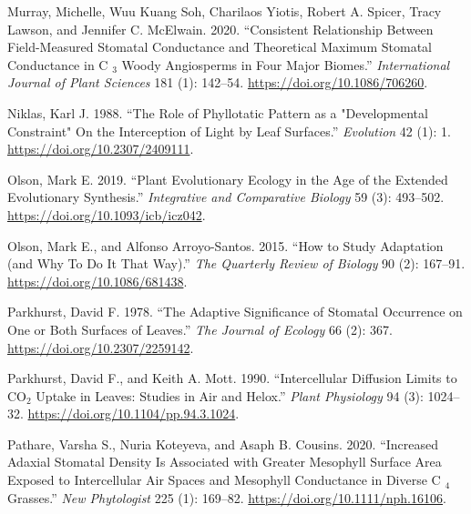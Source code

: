 \documentclass[
  12pt,
]{article}
\newlength{\cslhangindent}
\newlength{\cslentryspacingunit} %
\newenvironment{CSLReferences}[2] %
 {%
  \setlength{\parindent}{0pt}
  \ifodd #1
  \let\oldpar\par
  \def\par{\hangindent=\cslhangindent\oldpar}
  \fi
  \setlength{\parskip}{#2\cslentryspacingunit}
 }%
 {}
\begin{document}
\begin{CSLReferences}{1}{0}
\leavevmode{}%
Murray, Michelle, Wuu Kuang Soh, Charilaos Yiotis, Robert A. Spicer, Tracy Lawson, and Jennifer C. McElwain. 2020. {``Consistent {Relationship} Between {Field}-{Measured} {Stomatal} {Conductance} and {Theoretical} {Maximum} {Stomatal} {Conductance} in {C} \(_{\textrm{3}}\) {Woody} {Angiosperms} in {Four} {Major} {Biomes}.''} \emph{International Journal of Plant Sciences} 181 (1): 142--54. \url{https://doi.org/10.1086/706260}.

\leavevmode{}%
Niklas, Karl J. 1988. {``The {Role} of {Phyllotatic} {Pattern} as a "{Developmental} {Constraint}" {On} the {Interception} of {Light} by {Leaf} {Surfaces}.''} \emph{Evolution} 42 (1): 1. \url{https://doi.org/10.2307/2409111}.

\leavevmode{}%
Olson, Mark E. 2019. {``Plant {Evolutionary} {Ecology} in the {Age} of the {Extended} {Evolutionary} {Synthesis}.''} \emph{Integrative and Comparative Biology} 59 (3): 493--502. \url{https://doi.org/10.1093/icb/icz042}.

\leavevmode{}%
Olson, Mark E., and Alfonso Arroyo-Santos. 2015. {``How to {Study} {Adaptation} (and {Why} {To} {Do} {It} {That} {Way}).''} \emph{The Quarterly Review of Biology} 90 (2): 167--91. \url{https://doi.org/10.1086/681438}.

\leavevmode{}%
Parkhurst, David F. 1978. {``The {Adaptive} {Significance} of {Stomatal} {Occurrence} on {One} or {Both} {Surfaces} of {Leaves}.''} \emph{The Journal of Ecology} 66 (2): 367. \url{https://doi.org/10.2307/2259142}.

\leavevmode{}%
Parkhurst, David F., and Keith A. Mott. 1990. {``Intercellular Diffusion Limits to {CO}\(_{\textrm{2}}\) Uptake in Leaves: Studies in Air and Helox.''} \emph{Plant Physiology} 94 (3): 1024--32. \url{https://doi.org/10.1104/pp.94.3.1024}.

\leavevmode{}%
Pathare, Varsha S., Nuria Koteyeva, and Asaph B. Cousins. 2020. {``Increased Adaxial Stomatal Density Is Associated with Greater Mesophyll Surface Area Exposed to Intercellular Air Spaces and Mesophyll Conductance in Diverse {C} \(_{\textrm{4}}\) Grasses.''} \emph{New Phytologist} 225 (1): 169--82. \url{https://doi.org/10.1111/nph.16106}.


\end{CSLReferences}
\end{document}
